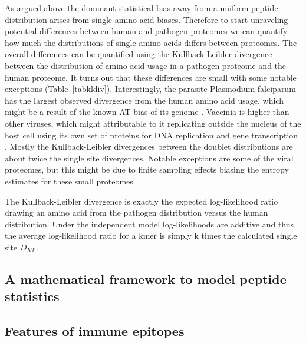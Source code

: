 \documentclass[superscriptaddress,twocolumn,pre]{revtex4}
\newcommand{\<}{\langle}
\renewcommand{\>}{\rangle}
\begin{document}
As argued above the dominant statistical bias away from a uniform peptide distribution arises from single amino acid biases. Therefore to start unraveling potential differences between human and pathogen proteomes we can quantify how much the distributions of single amino acids differs between proteomes. The overall differences can be quantified using the Kullback-Leibler divergence between the distribution of amino acid usage in a pathogen proteome and the human proteome. It turns out that these differences are small with some notable exceptions (Table~\ref{tabkldiv}). Interestingly, the parasite Plasmodium falciparum has the largest observed divergence from the human amino acid usage, which might be a result of the known AT bias of its genome \cite{Hamilton2017}. Vaccinia is higher than other viruses, which might attributable to it replicating outside the nucleus of the host cell using its own set of proteins for DNA replication and gene transcription \cite{Tolonen2001}. Mostly the Kullback-Leibler divergences between the doublet distributions are about twice the single site divergences. Notable exceptions are some of the viral proteomes, but this might be due to finite sampling effects biasing the entropy estimates for these small proteomes.

The Kullback-Leibler divergence is exactly the expected log-likelihood ratio drawing an amino acid from the pathogen distribution versus the human distribution. Under the independent model log-likelihoods are additive and thus the average log-likelihood ratio for a kmer is simply k times the calculated single site $D_{KL}$.


\subsection{A mathematical framework to model peptide statistics} 





\subsection{Features of immune epitopes}
\end{document}
